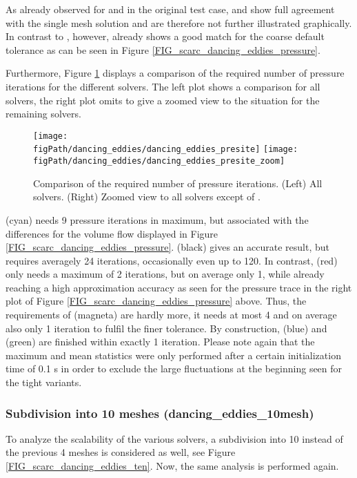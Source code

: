 As already observed for \ffttight{} and \uglmat{} in the original test case, \scarctight{} and \uscarc{} show full agreement with the single mesh solution and are therefore not further illustrated graphically.
In contrast to \fftdefault{}, however, \scarcdefault{} already shows a good match for the coarse default tolerance as can be seen in Figure \ref{FIG_scarc_dancing_eddies_pressure}. 

Furthermore, Figure \ref{FIG_scarc_dancing_eddies_presite} displays a comparison of the required number of pressure iterations for the different solvers. The left plot shows a comparison for all solvers, the right plot omits \ffttight{} to give a zoomed view to the situation for the remaining solvers. 

\begin{figure}[ht]
\begin{center}
\texttt{[image: \\figPath/dancing\_eddies/dancing\_eddies\_presite]}
\texttt{[image: \\figPath/dancing\_eddies/dancing\_eddies\_presite\_zoom]}
\end{center}
\caption[Results of different \scarc{} variants for the  {} test cases]{Comparison of the required number of pressure iterations. (Left) All solvers. (Right) Zoomed view to all solvers except of \ffttight{}.}
\label{FIG_scarc_dancing_eddies_presite}
\end{figure}

\fftdefault{} (cyan) needs 9 pressure iterations in maximum, but associated with the differences for the volume flow displayed in Figure \ref{FIG_scarc_dancing_eddies_pressure}. \ffttight{} (black) gives an accurate result, but requires averagely 24 iterations, occasionally even up to 120. 
In contrast, \scarcdefault{} (red) only needs a maximum of 2 iterations, but on average only 1, while already reaching a high approximation accuracy as seen for the pressure trace in the right plot of Figure \ref{FIG_scarc_dancing_eddies_pressure} above.
Thus, the requirements of \scarctight{} (magneta) are hardly more, it needs at most 4 and on average also only 1 iteration
to fulfil the finer tolerance.
By construction, \uglmat{} (blue) and \uscarc{} (green) are finished within exactly 1 iteration.
Please note again that the maximum and mean statistics were only performed after a certain initialization time of 0.1 s in order to exclude the large fluctuations at the beginning seen for the tight variants.

\subsubsection{Subdivision into 10 meshes ({\ct dancing\_eddies\_10mesh})}
To analyze the scalability of the various solvers, a subdivision into 10 instead of the previous 4 meshes is considered as well, see Figure \ref{FIG_scarc_dancing_eddies_ten}. Now, the same analysis is performed again.

